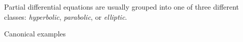 Partial differential equations are usually grouped into one of 
three different classes: {\em hyperbolic}, {\em parabolic}, 
or {\em elliptic}.

Canonical examples
